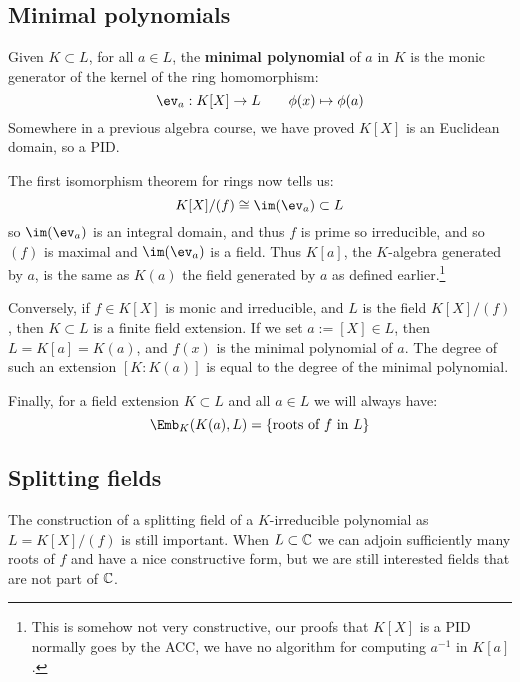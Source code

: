 \documentclass{article}
\begin{document}
\subsection{Minimal polynomials}

\begin{definition}
    Given $K\subset L$, for all $a\in L$, the \textbf{minimal polynomial} of $a$ in $K$ is the monic generator of the kernel of the ring homomorphism: \[
        \ev_a : K[X] \rightarrow L \qquad \phi(x) \mapsto \phi(a)
    \] Somewhere in a previous algebra course, we have proved $K[X]$ is an Euclidean domain, so a PID.
\end{definition}

The first isomorphism theorem for rings now tells us: \[
    K[X] / (f) \cong \im(\ev_a) \subset L
\] so $\im(\ev_a)$ is an integral domain, and thus $f$ is prime so irreducible, and so $(f)$ is maximal and $\im(\ev_a)$ is a field. Thus $K[a]$, the $K$-algebra generated by $a$, is the same as $K(a)$ the field generated by $a$ as defined earlier.\footnote{
    This is somehow not very constructive, our proofs that $K[X]$ is a PID normally goes by the ACC, we have no algorithm for computing $a^{-1}$ in $K[a]$.
}

Conversely, if $f\in K[X]$ is monic and irreducible, and $L$ is the field $K[X]/(f)$, then $K\subset L$ is a finite field extension. If we set $a:=[X] \in L$, then $L=K[a]=K(a)$, and $f(x)$ is the minimal polynomial of $a$. The degree of such an extension $[K:K(a)]$ is equal to the degree of the minimal polynomial.

Finally, for a field extension $K\subset L$ and all $a \in L$ we will always have: \[
    \Emb_K(K(a),L) = \{\text{roots of $f$ in $L$}\}
\]

\subsection{Splitting fields}

The construction of a splitting field of a $K$-irreducible polynomial as $L=K[X]/(f)$ is still important. When $L\subset \mathbb{C}$ we can adjoin sufficiently many roots of $f$ and have a nice constructive form, but we are still interested fields that are not part of $\mathbb{C}$.
\end{document}
